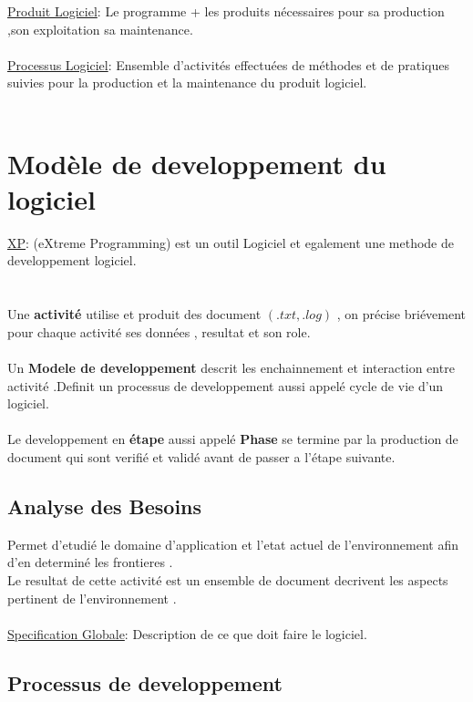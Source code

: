 \documentclass[a4paper,12pt,openany]{book}
\begin{document}
\underline{Produit Logiciel}: Le programme + les produits nécessaires pour sa production ,son exploitation sa maintenance.\\
\\
\underline{Processus Logiciel}: Ensemble d'activités effectuées de méthodes et de pratiques suivies  pour la production et la maintenance  du produit logiciel.\\
\\


\section{Modèle de developpement du logiciel}

\underline{XP}: (eXtreme Programming) est un outil Logiciel et egalement une methode de developpement logiciel.\\
\\
\\
Une \textbf{activité} utilise et produit des document $(.txt,.log)$ , on précise briévement pour chaque activité ses données , resultat et son role.\\
\\
Un \textbf{Modele de developpement} descrit les enchainnement et interaction entre activité .Definit un processus de developpement aussi appelé cycle de vie d'un logiciel.\\
\\
Le developpement en \textbf{étape} aussi appelé \textbf{Phase} se termine par la production de document qui sont verifié et validé avant de passer a l'étape suivante.\\


\subsection{Analyse des Besoins}

Permet d'etudié le domaine d'application et l'etat actuel de l'environnement afin d'en determiné les frontieres .\\
Le resultat de cette activité est un ensemble de document decrivent les aspects pertinent de l'environnement .\\
\\
\underline{Specification Globale}: Description de ce que doit faire le logiciel.\\


\subsection{Processus de developpement}
\end{document}
